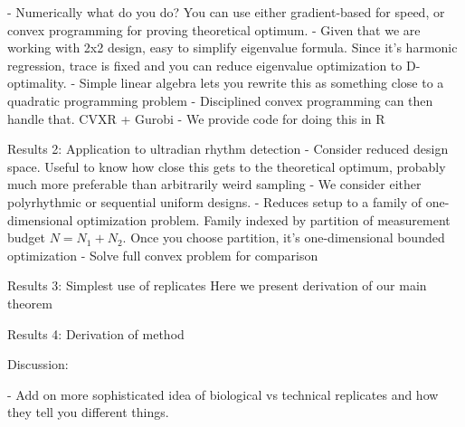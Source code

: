 - Numerically what do you do? You can use either gradient-based for speed, or convex programming for proving theoretical optimum.
- Given that we are working with 2x2 design, easy to simplify eigenvalue formula. Since it's harmonic regression, trace is fixed and you can reduce eigenvalue optimization to D-optimality.
- Simple linear algebra lets you rewrite this as something close to a quadratic programming problem
- Disciplined convex programming can then handle that. CVXR + Gurobi
- We provide code for doing this in R


Results 2: Application to ultradian rhythm detection
- Consider reduced design space. Useful to know how close this gets to the theoretical optimum, probably much more preferable than arbitrarily weird sampling
- We consider either polyrhythmic or sequential uniform designs. 
- Reduces setup to a family of one-dimensional optimization problem. Family indexed by partition of measurement budget $N=N_1+N_2$. Once you choose partition, it's one-dimensional bounded optimization
- Solve full convex problem for comparison



Results 3: Simplest use of replicates
Here we present derivation of our main theorem


Results 4: Derivation of method

Discussion:

- Add on more sophisticated idea of biological vs technical replicates and how they tell you different things.









































